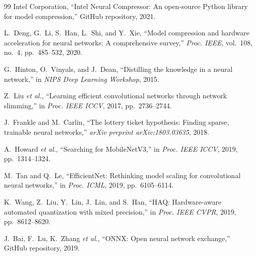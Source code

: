 \documentclass[10pt,twocolumn]{article}
\begin{document}
\begin{thebibliography}{99}
Intel Corporation, ``Intel Neural Compressor: An open-source Python library for model compression,'' GitHub repository, 2021.

L.~Deng, G.~Li, S.~Han, L.~Shi, and Y.~Xie, ``Model compression and hardware acceleration for neural networks: A comprehensive survey,'' \textit{Proc. IEEE}, vol.~108, no.~4, pp.~485--532, 2020.

G.~Hinton, O.~Vinyals, and J.~Dean, ``Distilling the knowledge in a neural network,'' in \textit{NIPS Deep Learning Workshop}, 2015.

Z.~Liu \textit{et al.}, ``Learning efficient convolutional networks through network slimming,'' in \textit{Proc. IEEE ICCV}, 2017, pp.~2736--2744.

J.~Frankle and M.~Carlin, ``The lottery ticket hypothesis: Finding sparse, trainable neural networks,'' \textit{arXiv preprint arXiv:1803.03635}, 2018.

A.~Howard \textit{et al.}, ``Searching for MobileNetV3,'' in \textit{Proc. IEEE ICCV}, 2019, pp.~1314--1324.

M.~Tan and Q.~Le, ``EfficientNet: Rethinking model scaling for convolutional neural networks,'' in \textit{Proc. ICML}, 2019, pp.~6105--6114.

K.~Wang, Z.~Liu, Y.~Lin, J.~Lin, and S.~Han, ``HAQ: Hardware-aware automated quantization with mixed precision,'' in \textit{Proc. IEEE CVPR}, 2019, pp.~8612--8620.

J.~Bai, F.~Lu, K.~Zhang \textit{et al.}, ``ONNX: Open neural network exchange,'' GitHub repository, 2019.

\end{thebibliography}
\end{document}
